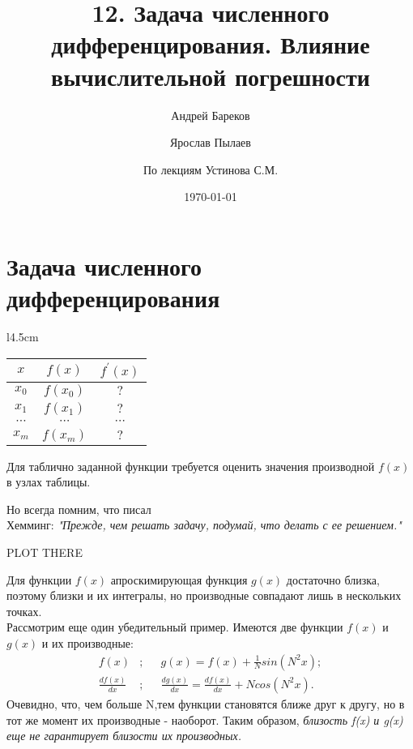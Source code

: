 \documentclass[a4paper,11pt]{article}
\title{12. Задача численного дифференцирования. Влияние вычислительной погрешности}
\author{Андрей Бареков \and Ярослав Пылаев \and По лекциям Устинова С.М.}
\date{\today}
\begin{document}
\maketitle
\newpage

\section{Задача численного дифференцирования}
\begin{minipage}{1\linewidth}
  \begin{wraptable}{l}{4.5cm}
    \begin{tabular}{ c|c|c }
      $x$ & $f(x)$ & $f^{'}(x)$ \\
      \hline
      $x_0$ & $f(x_0)$ & $?$ \\
      $x_1$ & $f(x_1)$ & $?$ \\
      $\cdots$ & $\cdots$ & $\cdots$ \\
      $x_m$ & $f(x_m)$ & $?$ \\
    \end{tabular}
  \end{wraptable}
  Для таблично заданной функции требуется оценить значения производной $f(x)$ в узлах таблицы.
  \begin{center}
    Но всегда помним, что писал \\
    Хемминг: \textit{"Прежде, чем решать задачу, подумай, что делать с ее решением."}
  \end{center}
\end{minipage}

\vspace{5mm}
\begin{center}
  PLOT THERE
\end{center}
Для функции $f(x)$ апроскимирующая функция $g(x)$ достаточно близка, поэтому близки и их интегралы,
но производные совпадают лишь в нескольких точках.\\

Рассмотрим еще один убедительный пример. Имеются две функции $f(x)$ и $g(x)$ и их производные:
\begin{align*}
  f(x) &;  & &g(x)=f(x)+\frac{1}{N}sin(N^2x); \\
  \frac{df(x)}{dx} &; & &\frac{dg(x)}{dx}=\frac{df(x)}{dx}+Ncos(N^2x).
\end{align*}
Очевидно, что, чем больше N,тем функции становятся ближе друг к другу, но в тот же момент их производные - наоборот.
Таким образом, \textit{близость f(x) и g(x) еще не гарантирует близости их производных.} \\
\end{document}
